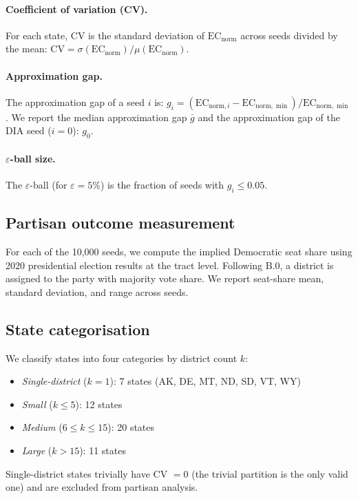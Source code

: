\paragraph{Coefficient of variation (CV).}
For each state, CV is the standard deviation of $\mathrm{EC}_{\mathrm{norm}}$
across seeds divided by the mean:
$\mathrm{CV} = \sigma(\mathrm{EC}_{\mathrm{norm}}) / \mu(\mathrm{EC}_{\mathrm{norm}})$.

\paragraph{Approximation gap.}
The approximation gap of a seed $i$ is:
$g_i = (\mathrm{EC}_{\mathrm{norm},i} - \mathrm{EC}_{\mathrm{norm},\min}) / \mathrm{EC}_{\mathrm{norm},\min}$.
We report the median approximation gap $\bar{g}$ and the approximation
gap of the DIA seed ($i = 0$): $g_0$.

\paragraph{$\varepsilon$-ball size.}
The $\varepsilon$-ball (for $\varepsilon = 5\%$) is the fraction of seeds
with $g_i \leq 0.05$.

\subsection{Partisan outcome measurement}

For each of the 10,000 seeds, we compute the implied Democratic seat share
using 2020 presidential election results at the tract level.
Following B.0, a district is assigned to the party with majority vote share.
We report seat-share mean, standard deviation, and range across seeds.

\subsection{State categorisation}

We classify states into four categories by district count $k$:
\begin{itemize}
  \item \emph{Single-district} ($k = 1$): 7 states (AK, DE, MT, ND, SD, VT, WY)
  \item \emph{Small} ($k \leq 5$): 12 states
  \item \emph{Medium} ($6 \leq k \leq 15$): 20 states
  \item \emph{Large} ($k > 15$): 11 states
\end{itemize}
Single-district states trivially have CV $= 0$ (the trivial partition is
the only valid one) and are excluded from partisan analysis.
